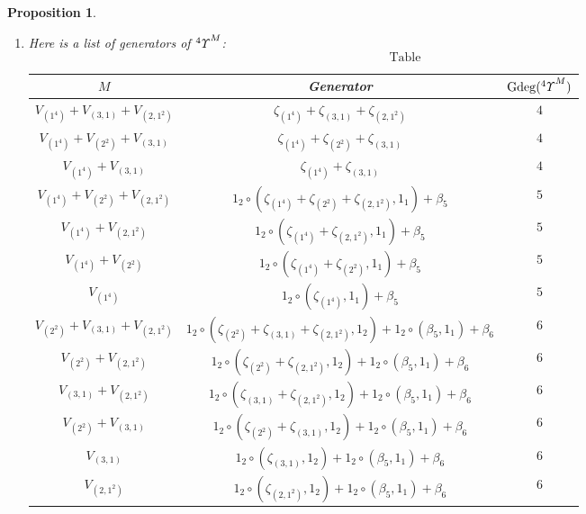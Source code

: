 \documentclass{amsart}
\newtheorem{prop}[thm]{Proposition}
\theoremstyle{definition}
\theoremstyle{remark}
\numberwithin{equation}{section}
\def\gd{\operatorname{Gdeg}}
\newcommand{\up}[1]{{^{#1}{\it \!\Upsilon}}}
\begin{document}
\begin{prop}
\label{yypro5.5}
\begin{enumerate}
\item[(1)]
Here is a list of generators of $\up{4}^M$:
\begin{equation}
\label{E5.5.1}\tag{E5.5.1}
\text{Table}
\end{equation}
\begin{center}
\begin{tabular}{|c|c|c|}
\hline
$M$ & Generator  & $\gd(\up{4}^M)$ \\ \hline 
$V_{(1^4)}+V_{(3,1)}+V_{(2,1^2)}$ & 
$\zeta_{(1^4)}+\zeta_{(3, 1)}+\zeta_{(2, 1^2)}$ & $4$ \\ \hline
$V_{(1^4)}+V_{(2^2)}+V_{(3,1)}$   & 
$\zeta_{(1^4)}+\zeta_{(2^2)}+\zeta_{(3, 1)}$    & $4$ \\ \hline
$V_{(1^4)}+V_{(3,1)}$             &  
$\zeta_{(1^4)}+\zeta_{(3,1)}$    & $4$ \\ \hline
$V_{(1^4)}+V_{(2^2)}+V_{(2,1^2)}$ & 
$1_2\circ(\zeta_{(1^4)}+\zeta_{(2^2)}+\zeta_{(2,1^2)}, 1_1)+\beta_5$  & $5$ \\ \hline 
$V_{(1^4)}+V_{(2,1^2)}$           &
$1_2\circ (\zeta_{(1^4)}+\zeta_{(2,1^2)}, 1_1)+\beta_5$    & $5$ \\ \hline
$V_{(1^4)}+V_{(2^2)}$             &    
$1_2\circ(\zeta_{(1^4)}+\zeta_{(2^2)}, 1_1)+\beta_5$   & $5$ \\ \hline
$V_{(1^4)}$                       &    
$1_2\circ(\zeta_{(1^4)}, 1_1) +\beta_5$         & $5$ \\ \hline
$V_{(2^2)}+V_{(3,1)}+V_{(2,1^2)}$ &  
$1_2\circ (\zeta_{(2^2)}+\zeta_{(3,1)}+\zeta_{(2,1^2)}, 1_2)
+1_2\circ (\beta_5, 1_1)+\beta_6$ & $6$ \\ \hline
$V_{(2^2)}+V_{(2,1^2)}$          &  
$1_2\circ (\zeta_{(2^2)}+\zeta_{(2,1^2)}, 1_2)
+1_2\circ (\beta_5, 1_1)+\beta_6$  & $6$ \\ \hline
$V_{(3,1)}+V_{(2,1^2)}$          & 
$1_2\circ (\zeta_{(3,1)}+\zeta_{(2,1^2)}, 1_2)
+1_2\circ (\beta_5, 1_1)+\beta_6$   & $6$ \\ \hline
$V_{(2^2)}+V_{(3,1)}$            &
$1_2\circ (\zeta_{(2^2)}+\zeta_{(3,1)}, 1_2)
+1_2\circ (\beta_5, 1_1)+\beta_6$   & $6$ \\ \hline
$V_{(3,1)}$                      & 
$1_2\circ (\zeta_{(3,1)}, 1_2)
+1_2\circ (\beta_5, 1_1)+\beta_6$       & $6$ \\ \hline
$V_{(2,1^2)}$  & $1_2\circ (\zeta_{(2,1^2)}, 1_2)
+1_2\circ (\beta_5, 1_1)+\beta_6$      & $6$ \\ \hline

\end{tabular}
\end{center}
\end{enumerate}
\end{prop}
\end{document}

